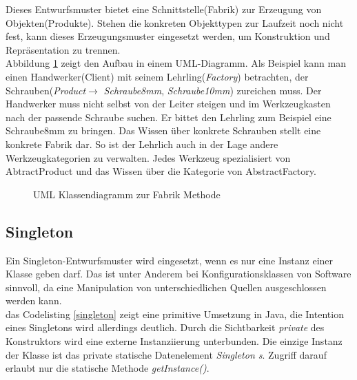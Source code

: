 Dieses Entwurfsmuster bietet eine Schnittstelle(Fabrik) zur Erzeugung von Objekten(Produkte). Stehen die konkreten Objekttypen zur Laufzeit noch nicht fest, kann dieses Erzeugungsmuster eingesetzt werden, um Konstruktion und Repräsentation zu trennen\cite[3.3]{starke:swa}.\\
Abbildung \ref{factorymethod} zeigt den Aufbau in einem UML-Diagramm. Als Beispiel kann man einen Handwerker(Client) mit seinem Lehrling(\textit{Factory}) betrachten, der Schrauben(\textit{Product}$\rightarrow$ \textit{Schraube8mm}, \textit{Schraube10mm}) zureichen muss. Der Handwerker muss nicht selbst von der Leiter steigen und im Werkzeugkasten nach der passende Schraube suchen. Er bittet den Lehrling zum Beispiel eine Schraube8mm zu bringen.
Das Wissen über konkrete Schrauben stellt eine konkrete Fabrik dar. So ist der Lehrlich auch in der Lage andere Werkzeugkategorien zu verwalten. Jedes Werkzeug spezialisiert von AbtractProduct und das Wissen über die Kategorie von AbstractFactory.

\begin{figure}[htbp]
  \vspace{0.5cm}
  \centering
   \caption{UML Klassendiagramm zur Fabrik Methode}
  \label{factorymethod}
  \vspace{0.5cm}
\end{figure}

\subsection{Singleton}

Ein Singleton-Entwurfsmuster wird eingesetzt, wenn es nur eine Instanz einer Klasse geben darf\cite[3.4]{starke:swa}. Das ist unter Anderem bei Konfigurationsklassen von Software sinnvoll, da eine Manipulation von unterschiedlichen Quellen ausgeschlossen werden kann.\\
das Codelisting \ref{singleton} zeigt eine primitive Umsetzung in Java, die Intention eines Singletons wird allerdings deutlich. Durch die Sichtbarkeit \textit{private} des Konstruktors wird eine externe Instanziierung unterbunden. Die einzige Instanz der Klasse ist das private statische Datenelement \textit{Singleton s}. Zugriff darauf erlaubt nur die statische Methode \textit{getInstance()}.

